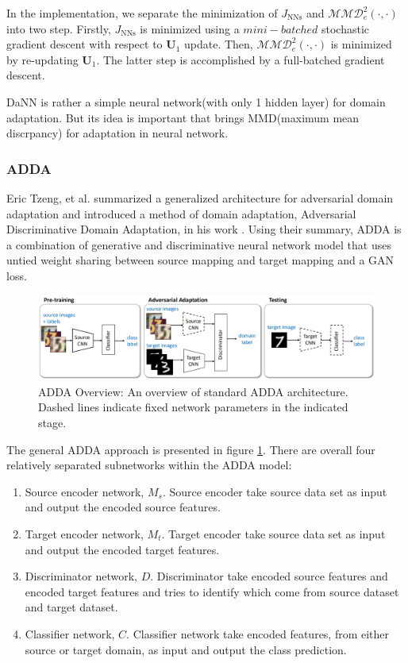 \documentclass[conference]{IEEEtran}
\begin{document}
\begin{enumerate}
\begin{tiny}
\begin{eqnarray}
\begin{aligned}
\end{aligned}
\end{eqnarray}
\end{tiny}
In the implementation, we separate the minimization of $J_{\mathrm{NNs}}$ and $\mathcal{M} \mathcal{M} \mathcal{D}_{e}^{2}(\cdot, \cdot)$ into two step. Firstly, $J_{\mathrm{NNs}}$ is minimized using a $mini-batched$ stochastic gradient descent with respect to $\mathbf{U}_{1}$ update. Then, $\mathcal{M} \mathcal{M} \mathcal{D}_{e}^{2}(\cdot, \cdot)$ is minimized by re-updating $\mathbf{U}_{1}$. The latter step is accomplished by a full-batched
gradient descent.
\end{enumerate}
DaNN is rather a simple neural network(with only 1 hidden layer) for domain adaptation. But its idea is important that brings MMD(maximum mean discrpancy) for adaptation in neural network.

\subsubsection{ADDA}
Eric Tzeng, et al. summarized a generalized architecture for adversarial domain adaptation and introduced a method of domain adaptation, Adversarial Discriminative Domain Adaptation, in his work \cite{ADDA1}. Using their summary, ADDA is a combination of generative and discriminative neural network model that uses untied weight sharing between source mapping and target mapping and a GAN loss.

\begin{figure}
  \centering
  \includegraphics[width=.75\textwidth]{LADDA_theorem1.jpg}
  \caption{ADDA Overview: An overview of standard ADDA architecture. Dashed lines indicate fixed network parameters in the indicated stage.}
  \label{ADDA_overview}
\end{figure}
The general ADDA approach is presented in figure \ref{ADDA_overview}. There are overall four relatively separated subnetworks within the ADDA model:
\begin{enumerate}
  \item Source encoder network, $M_s$. Source encoder take source data set as input and output the encoded source features.
  \item Target encoder network, $M_t$. Target encoder take source data set as input and output the encoded target features.
  \item Discriminator network, $D$. Discriminator take encoded source features and encoded target features and tries to identify which come from source dataset and target dataset.
  \item Classifier network, $C$. Classifier network take encoded features, from either source or target domain, as input and output the class prediction.
\end{enumerate}
\end{document}
